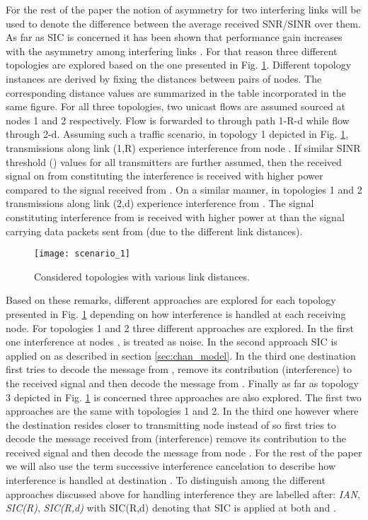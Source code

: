 \documentclass[conference]{IEEEtran}
\begin{document}
For the rest of the paper the notion of asymmetry for two interfering links will be used to denote the difference between
the average received SNR/SINR over them.
As far as SIC is concerned it has been shown that performance gain increases with
the asymmetry among interfering links \cite{b:TMC13}. For that reason three different topologies are explored based on the one
presented in Fig. \ref{fig:wireless_scenario}. Different topology instances are derived by fixing the distances between pairs
of nodes. The corresponding distance values are summarized in the table incorporated in the same figure.
For all three topologies, two unicast flows are assumed sourced at nodes 1 and 2 respectively. Flow  is forwarded to 
through path 1-R-d while flow  through 2-d.
Assuming such a traffic scenario, in topology 1 depicted in Fig. \ref{fig:wireless_scenario}, transmissions along link (1,R) experience
interference from node . If similar SINR threshold () values for all transmitters are further assumed, then the received signal
on  from  constituting the interference is received with higher power compared to the signal received from .
On a similar manner, in topologies 1 and 2 transmissions along link (2,d)
experience interference from . The signal constituting interference from  is received with higher power at  than the
signal carrying data packets sent from  (due to the different link distances).

\begin{figure}[t]
\centering
\texttt{[image: scenario\_1]}
\caption{Considered topologies with various link distances.}
\label{fig:wireless_scenario}
\end{figure}

Based on these remarks, different approaches are explored for each topology presented in Fig. \ref{fig:wireless_scenario} depending on how interference is handled
at each receiving node. For topologies 1 and 2 three different approaches are explored. In the first one interference at nodes ,  is treated as noise.
In the second approach SIC is applied on  as described in section \ref{sec:chan_model}.
In the third one destination  first tries to decode the message from , remove its contribution (interference) to the received signal
and then decode the message from .
Finally as far as topology 3 depicted in Fig. \ref{fig:wireless_scenario} is concerned three approaches are also explored.
The first two approaches are the same with topologies 1 and 2. In the third one however where the destination resides closer to transmitting
node  instead of  so  first tries to decode the message received from  (interference) remove its contribution to the received signal
and then decode the message from node .
For the rest of the paper we will also use the term successive interference cancelation to describe how interference is handled at destination .
To distinguish among the different approaches discussed above for handling interference
they are labelled after: \textit{IAN}, \textit{SIC(R)}, \textit{SIC(R,d)} with SIC(R,d) denoting that SIC is applied at both  and .
\end{document}
